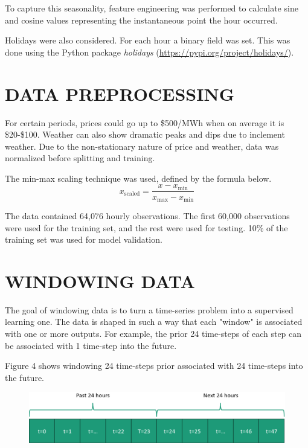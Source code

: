 \documentclass[9pt,a4paper,twoside]{rho}
\begin{document}
\noindent To capture this seasonality, feature engineering was performed to calculate sine and cosine values representing the instantaneous point the hour occurred.
    


\noindent Holidays were also considered. For each hour a binary field was set. This was done using the Python package \textit{holidays} (\url{https://pypi.org/project/holidays/}).

\section*{DATA PREPROCESSING}

For certain periods, prices could go up to \$500/MWh when on average it is \$20-\$100. Weather can also show dramatic peaks and dips due to inclement weather. Due to the non-stationary nature of price and weather, data was normalized before splitting and training. 

\noindent The min-max scaling technique was used, defined by the formula below.
\begin{equation} \label{eq:minmax_scaling}
	x_{\text{scaled}} = \frac{x - x_{\text{min}}}{x_{\text{max}} - x_{\text{min}}}
\end{equation}

\noindent The data contained 64,076 hourly observations. The first 60,000 observations were used for the training set, and the rest were used for testing. 10\% of the training set was used for model validation.

\section*{WINDOWING DATA}

The goal of windowing data is to turn a time-series problem into a supervised learning one. The data is shaped in such a way that each "window" is associated with one or more outputs. For example, the prior 24 time-steps of each step can be associated with 1 time-step into the future.

\noindent Figure 4 shows windowing 24 time-steps prior associated with 24 time-steps into the future.
\begin{figure}[H]
	\centering
	\includegraphics[width=0.8\columnwidth]{Figures/Windowing.png}
\end{figure}
\end{document}
